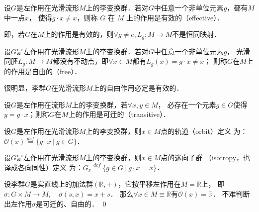 
\begin{definition}
    设$G$是左作用在光滑流形$M$上的李变换群．若对$G$中任意一个非单位元素$g$，都有$M$中一点$x$，
    使得$g \cdot x \neq x$，则称 $G$ 在 $M$ 上的作用是{\heiti  有效的}（effective）．
\end{definition}

即，若$G$在$M$上的作用是有效的，则$\forall g \neq e, L_{g}: M \rightarrow M$不是恒同映射．


\begin{definition}
    设$G$是左作用在光滑流形$M$上的李变换群．若对$G$中任意一个非单位元素$g$，
    光滑同胚$L_g: M \rightarrow M$都没有不动点，即$\forall x \in M$都有$L_g(x)=g \cdot x \neq x$；
    则称$G$在$M$上的作用是{\heiti 自由的}（free）．
\end{definition}


很明显，李群$G$在光滑流形$M$上的自由作用必定是有效的． 


\begin{definition}
    设$G$是左作用在流形$M$上的李变换群，若$\forall x, y \in M$，
    必存在一个元素$g \in G$使得$y=g \cdot x$；则称$G$在$M$上的作用是{\heiti 可迁的}（transitive）．    
\end{definition}



\begin{definition}
    设$G$是左作用在光滑流形$M$上的李变换群，则$x \in M$点的{\heiti 轨道}（orbit）定义
    为：$\mathcal{O}(x) \overset{def}{=} \{ g\cdot x \ | \  g\in G \}$．
\end{definition}


\begin{definition}\label{chlg:def_isotropy}
    设$G$是左作用在光滑流形$M$上的李变换群，则$x \in M$点的{\heiti 迷向子群}
    （isotropy，也译成{\kaishu 各向同性}）定义
    为：$G_x \overset{def}{=} \{ g\in G \ | \  g\cdot x = x \}$．
\end{definition}

\begin{example}
    设李群$G$是实直线上的加法群$(\mathbb{R},+)$，它按平移左作用在$M=\mathbb{R}$上，
    即$\sigma: G\times M \to M,\quad \sigma(s,x)=x+s$．
    那么$\forall x\in M\equiv \mathbb{R}$有$\mathcal{O}(x)=\mathbb{R}$．
    不难判断出左作用$\sigma$是可迁的、自由的． \qed
\end{example}

